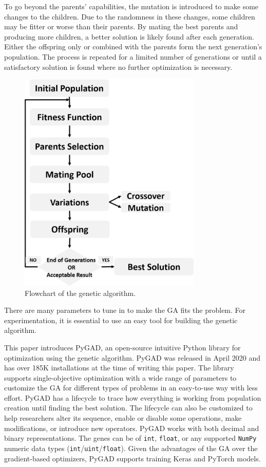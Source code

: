 \documentclass[conference]{IEEEtran}
\begin{document}
To go beyond the parents' capabilities, the mutation is introduced to make some changes to the children. Due to the randomness in these changes, some children may be fitter or worse than their parents. By mating the best parents and producing more children, a better solution is likely found after each generation. Either the offspring only or combined with the parents form the next generation's population. The process is repeated for a limited number of generations or until a satisfactory solution is found where no further optimization is necessary. 

\begin{figure}[t]
    \centering
    \includegraphics[width=8.7cm]{GASteps.png}
    \caption{Flowchart of the genetic algorithm.}
    \label{fig:gasteps}
\end{figure}

There are many parameters to tune in to make the GA fits the problem. For experimentation, it is essential to use an easy tool for building the genetic algorithm. 

This paper introduces PyGAD, an open-source intuitive Python library for optimization using the genetic algorithm. PyGAD was released in April 2020 and has over 185K installations at the time of writing this paper. The library supports single-objective optimization with a wide range of parameters to customize the GA for different types of problems in an easy-to-use way with less effort. PyGAD has a lifecycle to trace how everything is working from population creation until finding the best solution. The lifecycle can also be customized to help researchers alter its sequence, enable or disable some operations, make modifications, or introduce new operators. PyGAD works with both decimal and binary representations. The genes can be of \texttt{int}, \texttt{float}, or any supported \texttt{NumPy} numeric data types (\texttt{int}/\texttt{uint}/\texttt{float}). Given the advantages of the GA over the gradient-based optimizers, PyGAD supports training Keras and PyTorch models.
\end{document}
